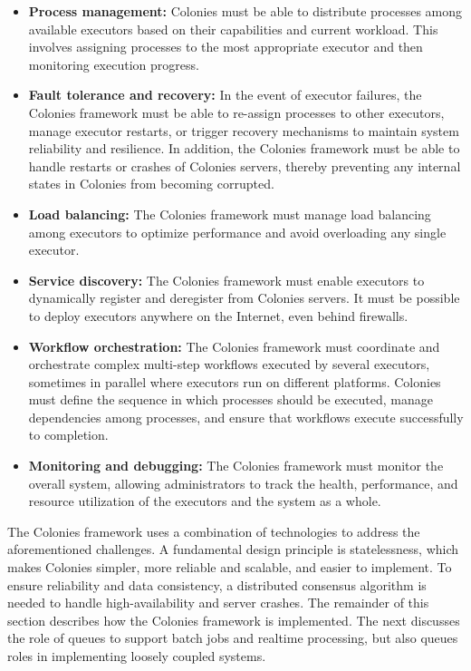 \documentclass{article}
\begin{document}
\begin{itemize}
\item \textbf{Process management:} Colonies must be able to distribute processes among available executors based on their capabilities and current workload. This involves assigning processes to the most appropriate executor and then monitoring execution progress.

\item \textbf{Fault tolerance and recovery:} In the event of executor failures, the Colonies framework must be able to re-assign processes to other executors, manage executor restarts, or trigger recovery mechanisms to maintain system reliability and resilience. In addition, the Colonies framework must be able to handle restarts or crashes of Colonies servers, thereby preventing any internal states in Colonies from becoming corrupted. 

\item \textbf{Load balancing:} The Colonies framework must manage load balancing among executors to optimize performance and avoid overloading any single executor.

\item \textbf{Service discovery:} The Colonies framework must enable executors to dynamically register and deregister from Colonies servers. It must be possible to deploy executors anywhere on the Internet, even behind firewalls.

\item \textbf{Workflow orchestration:} The Colonies framework must coordinate and orchestrate complex multi-step workflows executed by several executors, sometimes in parallel where executors run on different platforms. Colonies must define the sequence in which processes should be executed, manage dependencies among processes, and ensure that workflows execute successfully to completion.

\item \textbf{Monitoring and debugging:} The Colonies framework must monitor the overall system, allowing administrators to track the health, performance, and resource utilization of the executors and the system as a whole.
\end{itemize}

The Colonies framework uses a combination of technologies to address the aforementioned challenges. A fundamental design principle is statelessness, which makes Colonies simpler, more reliable and scalable, and easier to implement. To ensure reliability and data consistency, a distributed consensus algorithm is needed to handle high-availability and server crashes. The remainder of this section describes how the Colonies framework is implemented. The next discusses the role of queues to support batch jobs and realtime processing, but also queues roles in implementing loosely coupled systems.
\end{document}
